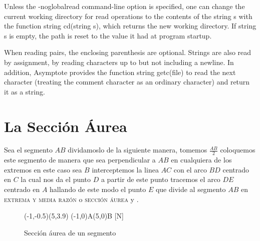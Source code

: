 \documentclass[a4paper]{book}
\begin{document}
Unless the -noglobalread command-line option is specified, one can change the current working directory for read operations to the contents of the string s with the function string cd(string s), which returns the new working directory. If string s is empty, the path is reset to the value it had at program startup.

When reading pairs, the enclosing parenthesis are optional. Strings are also read by assignment, by reading characters up to but not including a newline. In addition, Asymptote provides the function string getc(file) to read the next character (treating the comment character as an ordinary character) and return it as a string.




\section{La Sección Áurea}

Sea el segmento $AB$ dividamoslo de la siguiente manera, tomemos $\frac{AB}{2}$ coloquemos este segmento de manera que sea perpendicular a $AB$ en cualquiera de los extremos en este caso sea $B$ interceptemos la linea $AC$ con el arco $BD$ centrado en $C$ la cual nos da el punto $D$ a partir de este punto tracemos el arco $DE$ centrado en $A$ hallando de este modo el punto $E$ que divide al segmento $AB$ en \textsc{extrema y media razón} o \textsc{sección áurea} \cite{Phillips} y \cite{variablei}.

\begin{figure}[!ht]
	\begin{center}
		\begin{pspicture}[showgrid=false](-1,-0.5)(5,3.9)
			\pstGeonode[PosAngle={-180,-35},unit=1cm,CurveType=polyline](-1,0){A}(5,0){B}
			[N]
		\end{pspicture}
	\end{center}
	\caption{Sección áurea de un segmento}
	\label{Hw}
\end{figure}
\end{document}
